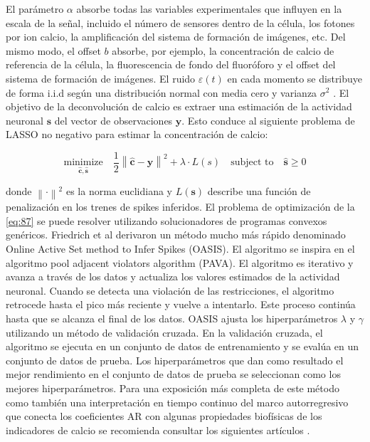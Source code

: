  
 El parámetro $\alpha$ absorbe todas las variables experimentales que influyen en la escala de la señal, incluido el número de sensores dentro de la célula, los fotones por ion calcio, la amplificación del sistema de formación de imágenes, etc. Del mismo modo, el offset $b$ absorbe, por ejemplo, la concentración de calcio de referencia de la célula, la fluorescencia de fondo del fluoróforo y el offset del sistema de formación de imágenes.   El ruido  $\varepsilon(t)$ en cada momento  se distribuye de forma  i.i.d según una distribución normal con media cero y varianza $\sigma^2$  \cite{vogelstein_fast_2010}. El objetivo de la deconvolución de calcio es extraer una estimación  de la actividad neuronal $\mathbf{s}$ del vector de observaciones $\mathbf{y}$. Esto conduce al siguiente problema de \gls{LASSO} no negativo para estimar la concentración de calcio:

\begin{equation}\label{eq:87}
	\underset{\hat{\mathbf{c}},\hat{\mathbf{s}}}{\text{minimize}} \quad  \frac{1}{2}\left\| \hat{\mathbf{c}}-\hat{\mathbf{y}}\right\|^2 +\lambda\cdot L(s) \quad \text{subject to}  \quad \hat{\mathbf{s}}\geq0
\end{equation}

donde $\left\|\cdot \right\|^2 $ es la norma euclidiana y $L(\mathbf{s})$ describe una función de penalización en los trenes de spikes inferidos.  El problema de optimización de la \cref{eq:87} se puede resolver utilizando solucionadores de programas convexos genéricos. Friedrich et al \cite{friedrich_fast_2017}   derivaron  un método mucho más rápido denominado Online Active Set method to Infer Spikes  (OASIS). El algoritmo se inspira en el algoritmo pool adjacent violators algorithm (PAVA). El algoritmo es  iterativo y  avanza a través de los datos y actualiza los valores estimados de la actividad neuronal. Cuando se detecta una violación de las restricciones, el algoritmo retrocede hasta el pico más reciente y vuelve a intentarlo. Este proceso continúa hasta que se alcanza el final de los datos.   OASIS ajusta los hiperparámetros $\lambda$ y $\gamma$ utilizando un método de validación cruzada. En la validación cruzada, el algoritmo  se ejecuta en un conjunto de datos de entrenamiento y se evalúa en un conjunto de datos de prueba. Los hiperparámetros que dan como resultado el mejor rendimiento en el conjunto de datos de prueba se seleccionan como los mejores hiperparámetros. Para una exposición más completa de este método como también una  interpretación en tiempo continuo del marco autorregresivo que conecta los coeficientes AR con algunas propiedades biofísicas de los indicadores de calcio se recomienda consultar los siguientes artículos \cite{pachitariu_robustness_2018,pnevmatikakis_simultaneous_2016,pnevmatikakis_bayesian_2013,friedrich_fast_2017}.


